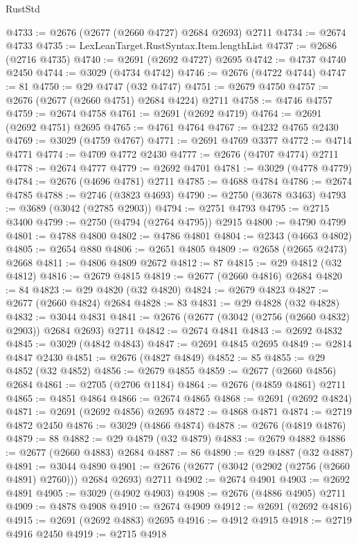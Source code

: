 \begin{lexlean}{RustStd}
\begin{coremodule}
@4733 := @2676 (@2677 (@2660 @4727) @2684 @2693) @2711
@4734 := @2674 @4733
@4735 := LexLeanTarget.RustSyntax.Item.lengthList
@4737 := @2686 (@2716 @4735)
@4740 := @2691 (@2692 @4727) @2695
@4742 := @4737 @4740 @2450
@4744 := @3029 (@4734 @4742)
@4746 := @2676 (@4722 @4744)
@4747 := 81
@4750 := @29 @4747 (@32 @4747)
@4751 := @2679 @4750
@4757 := @2676 (@2677 (@2660 @4751) @2684 @4224) @2711
@4758 := @4746 @4757
@4759 := @2674 @4758
@4761 := @2691 (@2692 @4719)
@4764 := @2691 (@2692 @4751) @2695
@4765 := @4761 @4764
@4767 := @4232 @4765 @2430
@4769 := @3029 (@4759 @4767)
@4771 := @2691 @4769 @3377
@4772 := @4714 @4771
@4774 := @4709 @4772 @2430
@4777 := @2676 (@4707 @4774) @2711
@4778 := @2674 @4777
@4779 := @2692 @4701
@4781 := @3029 (@4778 @4779)
@4784 := @2676 (@4696 @4781) @2711
@4785 := @4688 @4784
@4786 := @2674 @4785
@4788 := @2746 (@3823 @4693)
@4790 := @2750 (@3678 @3463)
@4793 := @3689 (@3042 (@2785 @2903))
@4794 := @2751 @4793
@4795 := @2715 @3400
@4799 := @2750 (@4794 (@2764 @4795)) @2915
@4800 := @4790 @4799
@4801 := @4788 @4800
@4802 := @4786 @4801
@4804 := @2343 (@4663 @4802)
@4805 := @2654 @880
@4806 := @2651 @4805
@4809 := @2658 (@2665 @2473) @2668
@4811 := @4806 @4809 @2672
@4812 := 87
@4815 := @29 @4812 (@32 @4812)
@4816 := @2679 @4815
@4819 := @2677 (@2660 @4816) @2684
@4820 := 84
@4823 := @29 @4820 (@32 @4820)
@4824 := @2679 @4823
@4827 := @2677 (@2660 @4824) @2684
@4828 := 83
@4831 := @29 @4828 (@32 @4828)
@4832 := @3044 @4831
@4841 := @2676 (@2677 (@3042 (@2756 (@2660 @4832) @2903)) @2684 @2693) @2711
@4842 := @2674 @4841
@4843 := @2692 @4832
@4845 := @3029 (@4842 @4843)
@4847 := @2691 @4845 @2695
@4849 := @2814 @4847 @2430
@4851 := @2676 (@4827 @4849)
@4852 := 85
@4855 := @29 @4852 (@32 @4852)
@4856 := @2679 @4855
@4859 := @2677 (@2660 @4856) @2684
@4861 := @2705 (@2706 @1184)
@4864 := @2676 (@4859 @4861) @2711
@4865 := @4851 @4864
@4866 := @2674 @4865
@4868 := @2691 (@2692 @4824)
@4871 := @2691 (@2692 @4856) @2695
@4872 := @4868 @4871
@4874 := @2719 @4872 @2450
@4876 := @3029 (@4866 @4874)
@4878 := @2676 (@4819 @4876)
@4879 := 88
@4882 := @29 @4879 (@32 @4879)
@4883 := @2679 @4882
@4886 := @2677 (@2660 @4883) @2684
@4887 := 86
@4890 := @29 @4887 (@32 @4887)
@4891 := @3044 @4890
@4901 := @2676 (@2677 (@3042 (@2902 (@2756 (@2660 @4891) @2760))) @2684 @2693) @2711
@4902 := @2674 @4901
@4903 := @2692 @4891
@4905 := @3029 (@4902 @4903)
@4908 := @2676 (@4886 @4905) @2711
@4909 := @4878 @4908
@4910 := @2674 @4909
@4912 := @2691 (@2692 @4816)
@4915 := @2691 (@2692 @4883) @2695
@4916 := @4912 @4915
@4918 := @2719 @4916 @2450
@4919 := @2715 @4918

\end{coremodule}
\end{lexlean}
